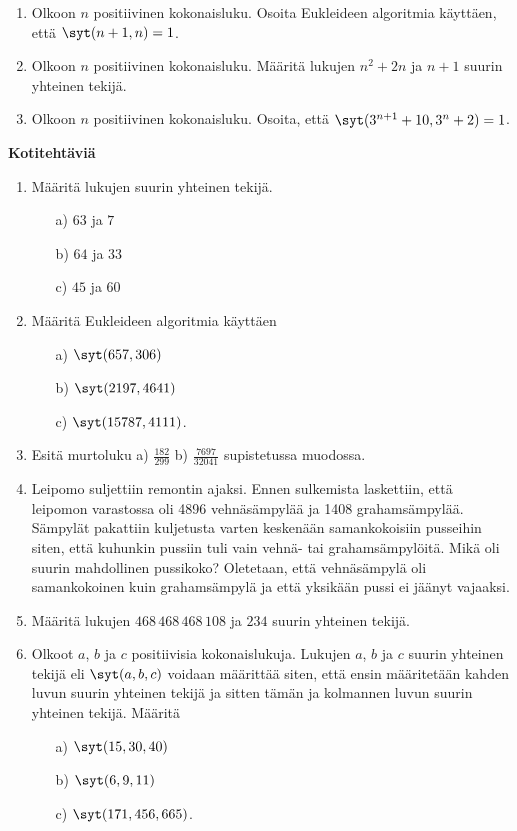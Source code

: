 \begin{enumerate}
\item Olkoon $n$ positiivinen kokonaisluku. Osoita Eukleideen algoritmia käyttäen, että $\syt(n+1,n)=1$.

\item Olkoon $n$ positiivinen kokonaisluku. Määritä lukujen $n^2 + 2n$ ja $n + 1$ suurin yhteinen tekijä.

\item Olkoon $n$ positiivinen kokonaisluku. Osoita, että $\syt(3^{n+1} + 10,3^n + 2)=1$.

\end{enumerate}


{\bf Kotitehtäviä}

\begin{enumerate}

\item Määritä lukujen suurin yhteinen tekijä.
\begin{itemize}
\item[a)] $63$ ja $7$
\item[b)] $64$ ja $33$
\item[c)] $45$ ja $60$
\end{itemize}

\item Määritä Eukleideen algoritmia käyttäen
\begin{itemize}
\item[a)] $\syt(657,306)$
\item[b)] $\syt(2197,4641)$
\item[c)] $\syt(15787,4111)$.
\end{itemize}

\item
Esitä murtoluku  a) $\frac{182}{299}$  b) $\frac{7697}{32041}$  supistetussa muodossa.

\item Leipomo suljettiin remontin ajaksi. Ennen sulkemista laskettiin, että leipomon varastossa oli 4896 vehnäsämpylää ja 1408 grahamsämpylää. Sämpylät pakattiin kuljetusta varten keskenään samankokoisiin pusseihin siten, että kuhunkin pussiin tuli vain vehnä- tai grahamsämpylöitä. Mikä oli suurin mahdollinen pussikoko? Oletetaan, että vehnäsämpylä oli samankokoinen kuin grahamsämpylä ja että yksikään pussi ei jäänyt vajaaksi.

\item Määritä lukujen $468\, 468\, 468\, 108$ ja $234$ suurin yhteinen tekijä.

\item Olkoot $a$, $b$ ja $c$ positiivisia kokonaislukuja. Lukujen $a$, $b$ ja $c$ suurin yhteinen tekijä eli $\syt(a,b,c)$ voidaan määrittää siten, että ensin määritetään kahden luvun suurin yhteinen tekijä ja sitten tämän ja kolmannen luvun suurin yhteinen tekijä. Määritä
\begin{itemize}
\item[a)] $\syt(15,30,40)$
\item[b)] $\syt(6,9,11)$
\item[c)] $\syt(171,456,665)$.
\end{itemize}


\end{enumerate}
